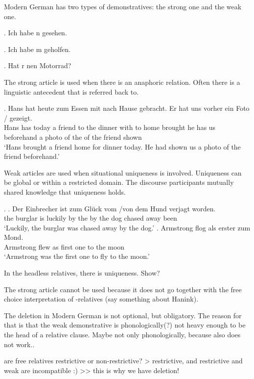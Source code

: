 Modern German has two types of demonstratives: the strong one and the weak one.

\ex. Ich habe n gesehen.

\ex. Ich habe m geholfen.

\ex. Hat r nen Motorrad?

The strong article is used when there is an anaphoric relation. Often there is a linguistic antecedent that is referred back to.

\exg. Hans hat heute   zum Essen mit nach Hause gebracht. Er hat uns vorher ein Foto /    gezeigt.\\
Hans has today a friend {to the} dinner with to home brought he has us beforehand a photo {of the} of the friend shown\\
`Hans brought a friend home for dinner today. He had shown us a photo of the friend beforehand.'

Weak articles are used when situational uniqueness is involved. Uniqueness can be global or within a restricted domain. The discourse participants mutually shared knowledge that uniqueness holds.

\ex.
\ag. Der Einbrecher ist {zum Glück} vom /von dem Hund verjagt worden.\\
the burglar is luckily {by the} by the dog {chased away} been\\
`Luckily, the burglar was chased away by the dog.'
\bg. Armstrong flog als erster zum Mond.\\
Armstrong flew as {first one} {to the} moon\\
`Armstrong was the first one to fly to the moon.' 

In the headless relatives, there is uniqueness. Show?

The strong article cannot be used because it does not go together with the free choice interpretation of -relatives (say something about Hanink).

The deletion in Modern German is not optional, but obligatory. The reason for that is that the weak demonstrative is phonologically(?) not heavy enough to be the head of a relative clause. Maybe not only phonologically, because  also does not work..

are free relatives restrictive or non-restrictive? > restrictive, and restrictive and weak are incompatible :)  >> this is why we have deletion!

